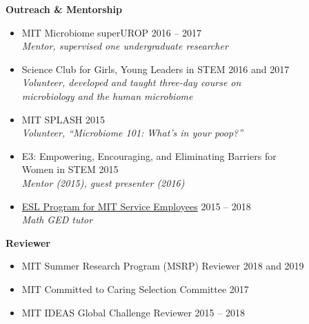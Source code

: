 \documentclass[10pt]{article}
\renewcommand{\section}[1]{\pagebreak[3]%
    \hyphenpenalty=10000%
    \vspace{1.3\baselineskip}%
    \phantomsection\addcontentsline{toc}{section}{#1}%
    \noindent\llap{\scshape\smash{\parbox[t]{\marginparwidth}{\raggedright #1}}}%
    \vspace{-\baselineskip}\par}
\newenvironment{outerlist}[1][\enskip\textbullet]%
        {\begin{itemize}[#1,leftmargin=*]}{\end{itemize}%
         \vspace{-.6\baselineskip}}
\begin{document}
\textbf{Outreach \& Mentorship}
\begin{outerlist}
	\item[] MIT Microbiome superUROP \hfill {2016 -- 2017} \\
	\textit{Mentor, supervised one undergraduate researcher}

	\item[] Science Club for Girls, Young Leaders in STEM \hfill {2016 and 2017} \\ \textit{Volunteer, developed and taught three-day course on} \\ \textit{microbiology and the human microbiome} 
	\item[] MIT SPLASH \hfill 2015 \\
	\textit{Volunteer, ``Microbiome 101: What's in your poop?''}
	\item[] E3: Empowering, Encouraging, and Eliminating Barriers for \\ Women in STEM \hfill 2015 \\
	\textit{Mentor (2015), guest presenter (2016)}
\item[] \href{https://hr.mit.edu/learn/esl}{ESL Program for MIT Service Employees} \hfill {2015 -- 2018} \\
\textit{Math GED tutor}
\end{outerlist}
\vspace{.15in}

\textbf{Reviewer}
\begin{outerlist}
	\item[] MIT Summer Research Program (MSRP) Reviewer \hfill {2018 and 2019} 
	\item[] MIT Committed to Caring Selection Committee \hfill {2017} 
	\item[] MIT IDEAS Global Challenge Reviewer \hfill {2015 -- 2018} 
	\end{outerlist}

%
\end{document}
